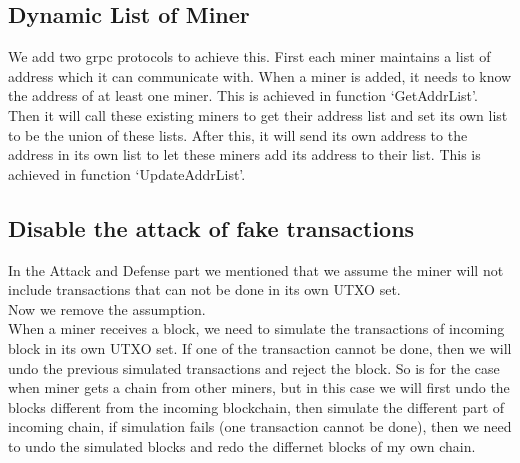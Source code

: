 \documentclass{article}
\begin{document}
\begin{spacing}{1.0}
		\subsection{Dynamic List of Miner}
		We add two grpc protocols to achieve this. First each miner maintains a list of address which it can communicate with.
		When a miner is added, it needs to know the address of at least one miner. This is achieved in function `GetAddrList'. Then it will call these existing miners to 
		get their address list and set its own list to be the union of these lists. After this, it will send its own address to the address in its own list
		to let these miners add its address to their list. This is achieved in function `UpdateAddrList'.
		\subsection{Disable the attack of fake transactions}
		In the Attack and Defense part we mentioned that we assume the miner will not include transactions that can not be done in its own UTXO set.\\
		Now we remove the assumption. \\
		When a miner receives a block, we need to simulate the transactions of incoming block in its own UTXO set. If one of the transaction cannot be done, then 
		we will undo the previous simulated transactions and reject the block. So is for the case when miner gets a chain from other miners, but in this case we will first 
		undo the blocks different from the incoming blockchain, then simulate the different part of incoming chain, if simulation fails (one transaction cannot be done), then we
		need to undo the simulated blocks and redo the differnet blocks of my own chain.

\end{spacing}
\end{document}
